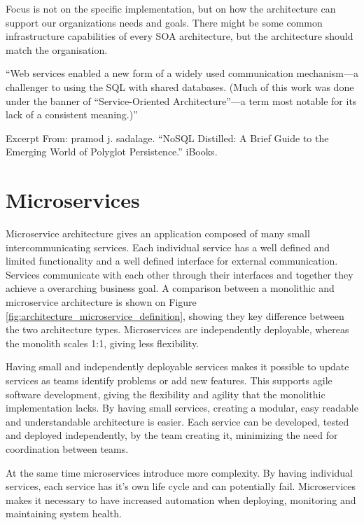 Focus is not on the specific implementation, but on how the architecture can support our organizations needs and goals. There might be some common infrastructure capabilities of every SOA architecture, but the architecture should match the organisation. 


“Web services enabled a new form of a widely used communication mechanism—a challenger to using the SQL with shared databases. (Much of this work was done under the banner of “Service-Oriented Architecture”—a term most notable for its lack of a consistent meaning.)”

Excerpt From: pramod j. sadalage. “NoSQL Distilled: A Brief Guide to the Emerging World of Polyglot Persistence.” iBooks. 



\section{Microservices}
Microservice architecture gives an application composed of many small intercommunicating services. Each individual service has a well defined and limited functionality and a well defined interface for external communication. Services communicate with each other through their interfaces and together they achieve a overarching business goal\cite[p.~2]{newman2015microservices}. A comparison between a monolithic and microservice architecture is shown on Figure \ref{fig:architecture_microservice_definition}, showing they key difference between the two architecture types. Microservices are independently deployable, whereas the monolith scales 1:1, giving less flexibility. 

Having small and independently deployable services makes it possible to update services as teams identify problems or add new features. This supports agile software development, giving the flexibility and agility that the monolithic implementation lacks. By having small services, creating a modular, easy readable and understandable architecture is easier. Each service can be developed, tested and deployed independently, by the team creating it, minimizing the need for coordination between teams\cite{kniberg2014spotify}.

At the same time microservices introduce more complexity. By having individual services, each service has it's own life cycle and can potentially fail. Microservices makes it necessary to have increased automation when deploying, monitoring and maintaining system health\cite{meshenberg2016microservices}.


